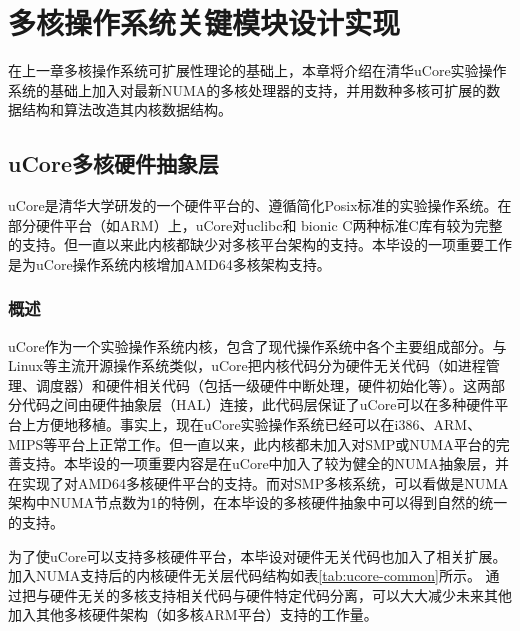 
\chapter{多核操作系统关键模块设计实现}
在上一章多核操作系统可扩展性理论的基础上，本章将介绍在清华uCore实验操作系统的基础上加入对最新NUMA的多核处理器的支持，并用数种多核可扩展的数据结构和算法改造其内核数据结构。
\section{uCore多核硬件抽象层}
uCore是清华大学研发的一个硬件平台的、遵循简化Posix标准的实验操作系统。在部分硬件平台（如ARM）上，uCore对uclibc和
bionic
C两种标准C库有较为完整的支持。但一直以来此内核都缺少对多核平台架构的支持。本毕设的一项重要工作是为uCore操作系统内核增加AMD64多核架构支持。

\subsection{概述}
uCore作为一个实验操作系统内核，包含了现代操作系统中各个主要组成部分。与Linux等主流开源操作系统类似，uCore把内核代码分为硬件无关代码（如进程管理、调度器）和硬件相关代码（包括一级硬件中断处理，硬件初始化等）。这两部分代码之间由硬件抽象层（HAL）连接，此代码层保证了uCore可以在多种硬件平台上方便地移植。事实上，现在uCore实验操作系统已经可以在i386、ARM、MIPS等平台上正常工作。但一直以来，此内核都未加入对SMP或NUMA平台的完善支持。本毕设的一项重要内容是在uCore中加入了较为健全的NUMA抽象层，并在实现了对AMD64多核硬件平台的支持。而对SMP多核系统，可以看做是NUMA架构中NUMA节点数为1的特例，在本毕设的多核硬件抽象中可以得到自然的统一的支持。

为了使uCore可以支持多核硬件平台，本毕设对硬件无关代码也加入了相关扩展。加入NUMA支持后的内核硬件无关层代码结构如表\ref{tab:ucore-common}所示。
通过把与硬件无关的多核支持相关代码与硬件特定代码分离，可以大大减少未来其他加入其他多核硬件架构（如多核ARM平台）支持的工作量。

